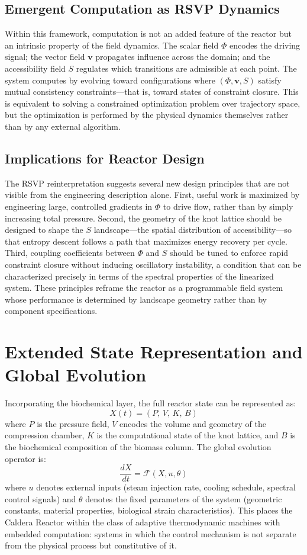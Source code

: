 \documentclass[12pt, a4paper]{article}
\begin{document}
\subsection{Emergent Computation as RSVP Dynamics}

Within this framework, computation is not an added feature of the reactor but an intrinsic property of the field dynamics. The scalar field $\Phi$ encodes the driving signal; the vector field $\mathbf{v}$ propagates influence across the domain; and the accessibility field $S$ regulates which transitions are admissible at each point. The system computes by evolving toward configurations where $(\Phi, \mathbf{v}, S)$ satisfy mutual consistency constraints—that is, toward states of constraint closure. This is equivalent to solving a constrained optimization problem over trajectory space, but the optimization is performed by the physical dynamics themselves rather than by any external algorithm.

\subsection{Implications for Reactor Design}

The RSVP reinterpretation suggests several new design principles that are not visible from the engineering description alone. First, useful work is maximized by engineering large, controlled gradients in $\Phi$ to drive flow, rather than by simply increasing total pressure. Second, the geometry of the knot lattice should be designed to shape the $S$ landscape—the spatial distribution of accessibility—so that entropy descent follows a path that maximizes energy recovery per cycle. Third, coupling coefficients between $\Phi$ and $S$ should be tuned to enforce rapid constraint closure without inducing oscillatory instability, a condition that can be characterized precisely in terms of the spectral properties of the linearized system. These principles reframe the reactor as a programmable field system whose performance is determined by landscape geometry rather than by component specifications.

\section{Extended State Representation and Global Evolution}

Incorporating the biochemical layer, the full reactor state can be represented as:
\[
X(t) = (P,\, V,\, K,\, B)
\]
where $P$ is the pressure field, $V$ encodes the volume and geometry of the compression chamber, $K$ is the computational state of the knot lattice, and $B$ is the biochemical composition of the biomass column. The global evolution operator is:
\[
\frac{dX}{dt} = \mathcal{F}(X, u, \theta)
\]
where $u$ denotes external inputs (steam injection rate, cooling schedule, spectral control signals) and $\theta$ denotes the fixed parameters of the system (geometric constants, material properties, biological strain characteristics). This places the Caldera Reactor within the class of adaptive thermodynamic machines with embedded computation: systems in which the control mechanism is not separate from the physical process but constitutive of it.
\end{document}
